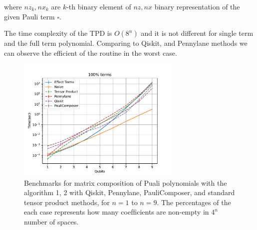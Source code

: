 where $nz_k, nx_k$ are $k$-th binary element of $nz, nx$ binary representation of the given Pauli term $\square$.

The time complexity of the TPD is $O(8^n)$ and it is not different for single term and the 
full term polynomial. 
Comparing to Qiskit, and Pennylane methods we can observe the efficient of the 
routine in the worst case.

\begin{figure}
    \centering
    \includegraphics[width=0.7\textwidth]{media/1_terms.pdf}
    \caption{Benchmarks for matrix composition of Puali polynomials with the algorithm 1, 2 with Qiskit, Pennylane,
    PauliComposer, and standard tensor product methods, for $n = 1$ to $n = 9$. The percentages of the each case represents
    how many coefﬁcients are non-empty in $4^n$ number of spaces.}
    \label{fig:composition_benchmark}
\end{figure}